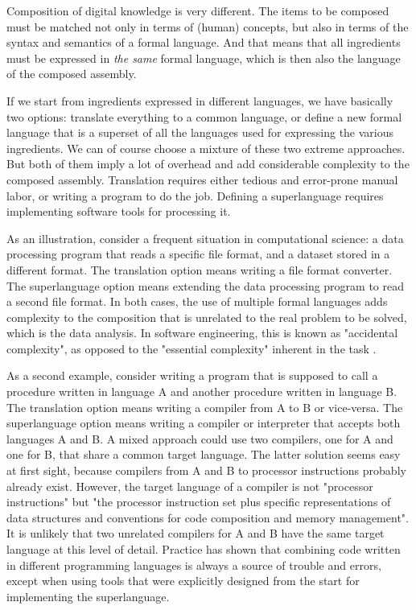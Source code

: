 Composition of digital knowledge is very different. The items to be composed must be matched not only in terms of (human) concepts, but also in terms of the syntax and semantics of a formal language. And that means that all ingredients must be expressed in \textit{the same} formal language, which is then also the language of the composed assembly.

If we start from ingredients expressed in different languages, we have basically two options: translate everything to a common language, or define a new formal language that is a superset of all the languages used for expressing the various ingredients. We can of course choose a mixture of these two extreme approaches. But both of them imply a lot of overhead and add considerable complexity to the composed assembly. Translation requires either tedious and error-prone manual labor, or writing a program to do the job. Defining a superlanguage requires implementing software tools for processing it.

As an illustration, consider a frequent situation in computational science: a data processing program that reads a specific file format, and a dataset stored in a different format. The translation option means writing a file format converter. The superlanguage option means extending the data processing program to read a second file format. In both cases, the use of multiple formal languages adds complexity to the composition that is unrelated to the real problem to be solved, which is the data analysis. In software engineering, this is known as "accidental complexity", as opposed to the "essential complexity" inherent in the task \cite{brooks_no_1987}.

As a second example, consider writing a program that is supposed to call a procedure written in language A and another procedure written in language B. The translation option means writing a compiler from A to B or vice-versa. The superlanguage option means writing a compiler or interpreter that accepts both languages A and B. A mixed approach could use two compilers, one for A and one for B, that share a common target language. The latter solution seems easy at first sight, because compilers from A and B to processor instructions probably already exist. However, the target language of a compiler is not "processor instructions" but "the processor instruction set plus specific representations of data structures and conventions for code composition and memory management". It is unlikely that two unrelated compilers for A and B have the same target language at this level of detail. Practice has shown that combining code written in different programming languages is always a source of trouble and errors, except when using tools that were explicitly designed from the start for implementing the superlanguage.

